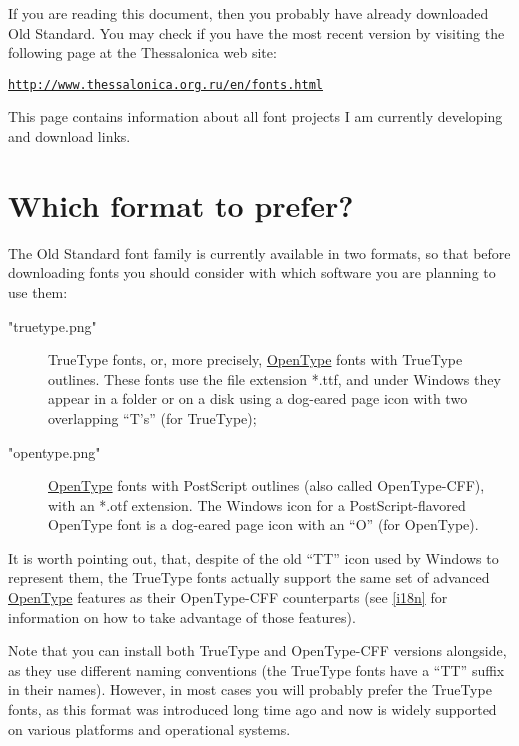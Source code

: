 \documentclass[12pt,a4paper,openany]{book}
\begin{document}
If you are reading this document, then you probably have already downloaded
Old Standard. You may check if you have the most recent version by visiting
the following page at the Thessalonica web site: 

\href{http://www.thessalonica.org.ru/en/fonts.html}
{\texttt{http://www.thessalonica.org.ru/en/fonts.html}}

This page contains information about all font projects I am currently
developing and download links.


\section{Which format to prefer?}

The Old Standard font family is currently available in two formats, so that
before downloading fonts you should consider with which software you are
planning to use them:

\begin{description}

\item[\XeTeXpicfile "truetype.png"] TrueType fonts, or, more precisely,
\hyperlink{OT}{OpenType} fonts with TrueType outlines. These fonts use the
file extension *.ttf, and under Windows they appear in a folder or on a
disk using a dog-eared page icon with two overlapping “T’s” (for
TrueType);

\item[\XeTeXpicfile "opentype.png"] \hyperlink{OT}{OpenType} fonts with
PostScript outlines (also called OpenType-CFF), with an *.otf extension.
The Windows icon for a PostScript-flavored OpenType font is a dog-eared
page icon with an “O” (for OpenType).

\end{description}

It is worth pointing out, that, despite of the old “TT” icon used by
Windows to represent them, the TrueType fonts actually support the
same set of advanced \hyperlink{OT}{OpenType} features as their
OpenType-CFF counterparts (see \autoref{i18n} for information on
how to take advantage of those features).

Note that you can install both TrueType and OpenType-CFF versions
alongside, as they use different naming conventions (the TrueType fonts
have a “TT” suffix in their names). However, in most cases you will
probably prefer the TrueType fonts, as this format was introduced long
time ago and now is widely supported on various platforms and operational
systems.
\end{document}
